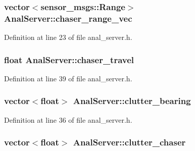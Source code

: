 \subsubsection[{\texorpdfstring{chaser\+\_\+range\+\_\+vec}{chaser_range_vec}}]{\setlength{\rightskip}{0pt plus 5cm}vector$<$sensor\+\_\+msgs\+::\+Range$>$ Anal\+Server\+::chaser\+\_\+range\+\_\+vec}\hypertarget{class_anal_server_af1735aa99a3a1aa3e512ba6dd233a2b9}{}\label{class_anal_server_af1735aa99a3a1aa3e512ba6dd233a2b9}


Definition at line 23 of file anal\+\_\+server.\+h.

\subsubsection[{\texorpdfstring{chaser\+\_\+travel}{chaser_travel}}]{\setlength{\rightskip}{0pt plus 5cm}float Anal\+Server\+::chaser\+\_\+travel}\hypertarget{class_anal_server_ab2cd826904a14b29b2ea370bf5530a7c}{}\label{class_anal_server_ab2cd826904a14b29b2ea370bf5530a7c}


Definition at line 39 of file anal\+\_\+server.\+h.

\subsubsection[{\texorpdfstring{clutter\+\_\+bearing}{clutter_bearing}}]{\setlength{\rightskip}{0pt plus 5cm}vector$<$float$>$ Anal\+Server\+::clutter\+\_\+bearing}\hypertarget{class_anal_server_a54b7f88580a377bae80c7549528213ff}{}\label{class_anal_server_a54b7f88580a377bae80c7549528213ff}


Definition at line 36 of file anal\+\_\+server.\+h.

\subsubsection[{\texorpdfstring{clutter\+\_\+chaser}{clutter_chaser}}]{\setlength{\rightskip}{0pt plus 5cm}vector$<$float$>$ Anal\+Server\+::clutter\+\_\+chaser}\hypertarget{class_anal_server_a08f0632361072950ab74c9ddd7357962}{}\label{class_anal_server_a08f0632361072950ab74c9ddd7357962}


